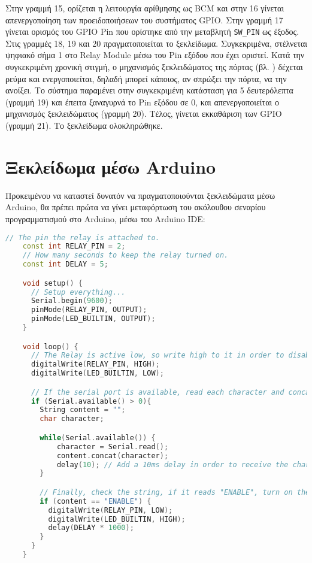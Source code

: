 	Στην γραμμή 15, ορίζεται η λειτουργία αρίθμησης ως BCM και στην 16 γίνεται απενεργοποίηση των προειδοποιήσεων του συστήματος GPIO. Στην γραμμή 17 γίνεται ορισμός του GPIO Pin που ορίστηκε από την μεταβλητή \verb|SW_PIN| ως έξοδος. Στις γραμμές 18, 19 και 20 πραγματοποιείται το ξεκλείδωμα. Συγκεκριμένα, στέλνεται ψηφιακό σήμα 1 στο Relay Module μέσω του Pin εξόδου που έχει οριστεί. Κατά την συγκεκριμένη χρονική στιγμή, ο μηχανισμός ξεκλειδώματος της πόρτας (βλ. ) δέχεται ρεύμα και ενεργοποιείται, δηλαδή μπορεί κάποιος, αν σπρώξει την πόρτα, να την ανοίξει. Το σύστημα παραμένει στην συγκεκριμένη κατάσταση  για 5 δευτερόλεπτα (γραμμή 19) και έπειτα ξαναγυρνά το Pin εξόδου σε 0, και απενεργοποιείται ο μηχανισμός ξεκλειδώματος (γραμμή 20). Τέλος, γίνεται εκκαθάριση των GPIO (γραμμή 21). Το ξεκλείδωμα ολοκληρώθηκε.

\section{Ξεκλείδωμα μέσω Arduino}
	Προκειμένου να καταστεί δυνατόν να πραγματοποιούνται ξεκλειδώματα μέσω Arduino, θα πρέπει πρώτα να γίνει μεταφόρτωση του ακόλουθου σεναρίου προγραμματισμού στο Arduino, μέσω του Arduino IDE:

	\begin{lstlisting}[language=C++, caption=Σενάριο Ξεκλειδώματος Arduino, label={lst:arduino_unlockscript}]
	// The pin the relay is attached to.
	const int RELAY_PIN = 2;
	// How many seconds to keep the relay turned on.
	const int DELAY = 5;

	void setup() {
	  // Setup everything...
	  Serial.begin(9600);
	  pinMode(RELAY_PIN, OUTPUT);
	  pinMode(LED_BUILTIN, OUTPUT);
	}

	void loop() {
	  // The Relay is active low, so write high to it in order to disable it.
	  digitalWrite(RELAY_PIN, HIGH);
	  digitalWrite(LED_BUILTIN, LOW);

	  // If the serial port is available, read each character and concatenate it to a string.
	  if (Serial.available() > 0){
	    String content = "";
	    char character;

	    while(Serial.available()) {
	        character = Serial.read();
	        content.concat(character);
	        delay(10); // Add a 10ms delay in order to receive the characters correctly.
	    }

	    // Finally, check the string, if it reads "ENABLE", turn on the relay, wait for 5 seconds, then turn it off.
	    if (content == "ENABLE") {
	      digitalWrite(RELAY_PIN, LOW);
	      digitalWrite(LED_BUILTIN, HIGH);
	      delay(DELAY * 1000);
	    }
	  }
	}\end{lstlisting}


